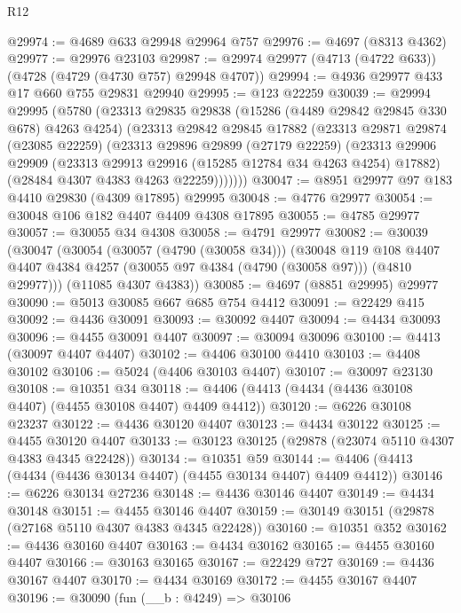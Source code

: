 \begin{lexlean}{R12}
\begin{coremodule}
@29974 := @4689 @633 @29948 @29964 @757
@29976 := @4697 (@8313 @4362)
@29977 := @29976 @23103
@29987 := @29974 @29977 (@4713 (@4722 @633)) (@4728 (@4729 (@4730 @757) @29948 @4707))
@29994 := @4936 @29977 @433 @17 @660 @755 @29831 @29940
@29995 := @123 @22259
@30039 := @29994
    @29995
    (@5780
      (@23313
        @29835
        @29838
        (@15286 (@4489 @29842 @29845 @330 @678) @4263 @4254)
        (@23313
          @29842
          @29845
          @17882
          (@23313
            @29871
            @29874
            (@23085 @22259)
            (@23313
              @29896
              @29899
              (@27179 @22259)
              (@23313
                @29906
                @29909
                (@23313 @29913 @29916 (@15285 @12784 @34 @4263 @4254) @17882)
                (@28484 @4307 @4383 @4263 @22259)))))))
@30047 := @8951 @29977 @97 @183 @4410 @29830 (@4309 @17895) @29995
@30048 := @4776 @29977
@30054 := @30048 @106 @182 @4407 @4409 @4308 @17895
@30055 := @4785 @29977
@30057 := @30055 @34 @4308
@30058 := @4791 @29977
@30082 := @30039
    (@30047
      (@30054
        (@30057 (@4790 (@30058 @34)))
        (@30048
          @119
          @108
          @4407
          @4407
          @4384
          @4257
          (@30055 @97 @4384 (@4790 (@30058 @97)))
          (@4810 @29977)))
      (@11085 @4307 @4383))
@30085 := @4697 (@8851 @29995) @29977
@30090 := @5013 @30085 @667 @685 @754 @4412
@30091 := @22429 @415
@30092 := @4436 @30091
@30093 := @30092 @4407
@30094 := @4434 @30093
@30096 := @4455 @30091 @4407
@30097 := @30094 @30096
@30100 := @4413 (@30097 @4407 @4407)
@30102 := @4406 @30100 @4410
@30103 := @4408 @30102
@30106 := @5024 (@4406 @30103 @4407)
@30107 := @30097 @23130
@30108 := @10351 @34
@30118 := @4406 (@4413 (@4434 (@4436 @30108 @4407) (@4455 @30108 @4407) @4409 @4412))
@30120 := @6226 @30108 @23237
@30122 := @4436 @30120 @4407
@30123 := @4434 @30122
@30125 := @4455 @30120 @4407
@30133 := @30123 @30125 (@29878 (@23074 @5110 @4307 @4383 @4345 @22428))
@30134 := @10351 @59
@30144 := @4406 (@4413 (@4434 (@4436 @30134 @4407) (@4455 @30134 @4407) @4409 @4412))
@30146 := @6226 @30134 @27236
@30148 := @4436 @30146 @4407
@30149 := @4434 @30148
@30151 := @4455 @30146 @4407
@30159 := @30149 @30151 (@29878 (@27168 @5110 @4307 @4383 @4345 @22428))
@30160 := @10351 @352
@30162 := @4436 @30160 @4407
@30163 := @4434 @30162
@30165 := @4455 @30160 @4407
@30166 := @30163 @30165
@30167 := @22429 @727
@30169 := @4436 @30167 @4407
@30170 := @4434 @30169
@30172 := @4455 @30167 @4407
@30196 := @30090
    (fun (__b : @4249) =>
    @30106

\end{coremodule}
\end{lexlean}
